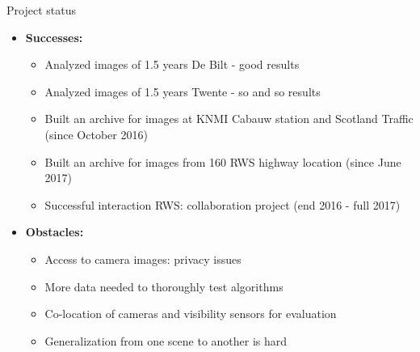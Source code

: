 \documentclass[10pt,fleqn]{beamer}\usepackage[]{graphicx}\usepackage[]{color}
\begin{document}
\begin{frame}{Project status}
\begin{itemize}
\item \textbf{Successes:}
\begin{itemize}
\item{ Analyzed images of 1.5 years De Bilt - good results}
\item {Analyzed images of 1.5 years Twente - so and so results}
\item {Built an archive for images at KNMI Cabauw station and Scotland Traffic (since October 2016)}
\item {Built an archive for images from 160 RWS highway location (since June 2017)}
\item {Successful interaction RWS: collaboration project (end 2016 - full 2017)}

\end{itemize}

\item \textbf{Obstacles:}
\begin{itemize}
\item{Access to camera images: privacy issues}
\item{More data needed to thoroughly test algorithms}
\item{Co-location of cameras and visibility sensors for evaluation}
\item{Generalization from one scene to another is hard}
\end{itemize}
\end{itemize}
\end{frame}
\end{document}

